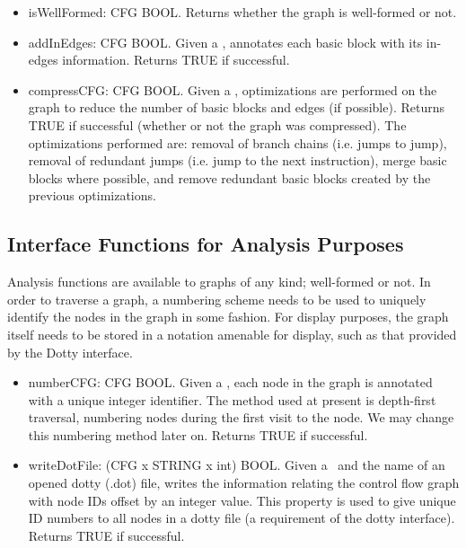\begin{itemize}
\item isWellFormed: CFG \ra BOOL.
    Returns whether the graph is well-formed or not.

\item addInEdges: CFG \ra BOOL.  
    Given a \wfCFG, annotates each basic block with its in-edges 
    information.  Returns TRUE if successful.

\item compressCFG: CFG \ra BOOL.  
    Given a \wfCFG, optimizations are performed on the graph to reduce 
    the number of basic blocks and edges (if possible).  Returns
    TRUE if successful (whether or not the graph was compressed).
    The optimizations performed are: removal of branch
    chains (i.e. jumps to jump), removal of redundant jumps (i.e. jump
    to the next instruction), merge basic blocks where possible, and
    remove redundant basic blocks created by the previous optimizations.
\end{itemize}


\subsection{Interface Functions for Analysis Purposes}
Analysis functions are available to graphs of any kind; well-formed
or not.
In order to traverse a graph, a numbering scheme needs to be used
to uniquely identify the nodes in the graph in some fashion.  
For display purposes, the graph itself needs to be stored in a 
notation amenable for display, such as that provided by the Dotty 
interface. 

\begin{itemize}
\item numberCFG: CFG \ra BOOL.  
    Given a \wfCFG, each node in the graph is annotated with a unique 
    integer identifier.
    The method used at present is depth-first traversal, numbering
    nodes during the first visit to the node.
    We may change this numbering method later on.  
    Returns TRUE if successful.

\item writeDotFile: (CFG x STRING x int) \ra BOOL.  
    Given a \wfCFG\ and the name of an opened dotty (.dot) file,
    writes the information relating the control flow graph with
    node IDs offset by an integer value.  This property is used
    to give unique ID numbers to all nodes in a dotty file (a 
    requirement of the dotty interface).
    Returns TRUE if successful.
\end{itemize}


